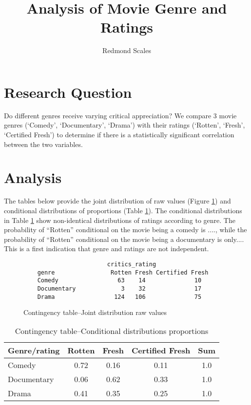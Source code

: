 \documentclass[12pt,a4paper]{article}
\author{Redmond Scales}
\title{Analysis of Movie Genre and Ratings}
\begin{document}

\maketitle %
	
\section{Research Question} %
Do different genres receive varying critical appreciation? We compare 3 movie genres (`Comedy', `Documentary', `Drama') with their ratings (`Rotten', `Fresh', `Certified Fresh') to determine if there is a statistically significant correlation between the two variables.

\section{Analysis}
The tables below provide the joint distribution of raw values (Figure \ref{tab:tab}) and conditional distributions of proportions (Table \ref{tab:prob_tab}). The  conditional distributions in Table \ref{tab:prob_tab}  show non-identical distributions of ratings according to genre. The probability of ``Rotten'' conditional on the movie being a comedy is ...., while the probability of ``Rotten'' conditional on the movie being a documentary is only.... This is a first indication that genre and ratings are not independent. 
	
\begin{figure}[H] %
\begin{verbatim} 
	                    critics_rating
	genre                Rotten Fresh Certified Fresh
	Comedy                 63    14              10
	Documentary             3    32              17
	Drama                 124   106              75
\end{verbatim}
\caption{Contingency table--Joint distribution raw values}
\label{tab:tab}
\end{figure}

\begin{table}[H] %
\centering
\begin{tabular}{lcccc} 
\hline
Genre/rating & Rotten & Fresh & Certified Fresh & Sum \\ 
\hline
Comedy & 0.72 & 0.16 & 0.11 &1.0 \\ 
Documentary & 0.06 & 0.62 &  0.33 & 1.0 \\
Drama & 0.41 & 0.35 & 0.25 &1.0 \\
\hline
\end{tabular}
\caption{Contingency table--Conditional distributions proportions}
\label{tab:prob_tab}
\end{table}
\end{document}
